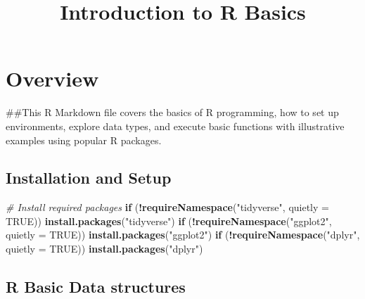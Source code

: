 \documentclass[
]{article}
\title{Introduction to R Basics}
\author{}
\date{\vspace{-2.5em}}
\newenvironment{Shaded}{\begin{snugshade}}{\end{snugshade}}
\newcommand{\CommentTok}[1]{\textcolor[rgb]{0.56,0.35,0.01}{\textit{#1}}}
\newcommand{\ControlFlowTok}[1]{\textcolor[rgb]{0.13,0.29,0.53}{\textbf{#1}}}
\newcommand{\DataTypeTok}[1]{\textcolor[rgb]{0.13,0.29,0.53}{#1}}
\newcommand{\KeywordTok}[1]{\textcolor[rgb]{0.13,0.29,0.53}{\textbf{#1}}}
\newcommand{\NormalTok}[1]{#1}
\newcommand{\OperatorTok}[1]{\textcolor[rgb]{0.81,0.36,0.00}{\textbf{#1}}}
\newcommand{\OtherTok}[1]{\textcolor[rgb]{0.56,0.35,0.01}{#1}}
\newcommand{\StringTok}[1]{\textcolor[rgb]{0.31,0.60,0.02}{#1}}
\begin{document}
\maketitle

\hypertarget{overview}{%
\section{Overview}\label{overview}}

\#\#This R Markdown file covers the basics of R programming, how to set
up environments, explore data types, and execute basic functions with
illustrative examples using popular R packages.

\hypertarget{installation-and-setup}{%
\subsection{Installation and Setup}\label{installation-and-setup}}

\begin{Shaded}
\begin{Highlighting}[]
\CommentTok{# Install required packages}
\ControlFlowTok{if}\NormalTok{ (}\OperatorTok{!}\KeywordTok{requireNamespace}\NormalTok{(}\StringTok{"tidyverse"}\NormalTok{, }\DataTypeTok{quietly =} \OtherTok{TRUE}\NormalTok{)) }\KeywordTok{install.packages}\NormalTok{(}\StringTok{"tidyverse"}\NormalTok{)}
\ControlFlowTok{if}\NormalTok{ (}\OperatorTok{!}\KeywordTok{requireNamespace}\NormalTok{(}\StringTok{"ggplot2"}\NormalTok{, }\DataTypeTok{quietly =} \OtherTok{TRUE}\NormalTok{)) }\KeywordTok{install.packages}\NormalTok{(}\StringTok{"ggplot2"}\NormalTok{)}
\ControlFlowTok{if}\NormalTok{ (}\OperatorTok{!}\KeywordTok{requireNamespace}\NormalTok{(}\StringTok{"dplyr"}\NormalTok{, }\DataTypeTok{quietly =} \OtherTok{TRUE}\NormalTok{)) }\KeywordTok{install.packages}\NormalTok{(}\StringTok{"dplyr"}\NormalTok{) }
\end{Highlighting}
\end{Shaded}

\hypertarget{r-basic-data-structures}{%
\subsection{R Basic Data structures}\label{r-basic-data-structures}}
\end{document}
